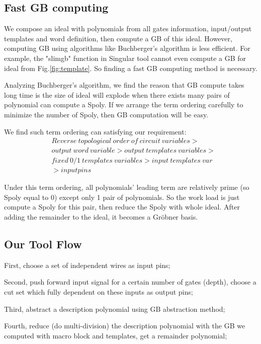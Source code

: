\documentclass[conference,10pt]{IEEEtran}
\begin{document}
\subsection{Fast GB computing}
We compose an ideal with polynomials from all gates information, input/output templates and word definition,
then compute a GB of this ideal. However, computing GB using algorithms like Buchberger's algorithm is
less efficient. For example, the "slimgb" function in Singular tool cannot even compute a GB for ideal
from Fig.\ref{fig:template}. So finding a fast GB computing method is necessary.

Analyzing Buchberger's algorithm, we find the reason that GB compute takes long time is the size of ideal
will explode when there exists many pairs of polynomial can compute a Spoly. If we arrange the term ordering
carefully to minimize the number of Spoly, then GB computation will be easy.

We find such term ordering can satisfying our requirement:
\begin{align}
&Reverse\ topological\ order\ of\ circuit\ variables > \nonumber\\
& output\ word\ variable > output\ templates\ variables>\nonumber\\
& fixed\ 0/1\ templates\ variables > input\ templates\ var\nonumber\\
& > input pins \nonumber
\end{align}

Under this term ordering, all polynomials' leading term are relatively prime (so Spoly equal to 0)
except only 1 pair of polynomials. So the work load is just compute a Spoly for this pair,
then reduce the Spoly with whole ideal. After adding the remainder to the ideal, it becomes
a Gr\"obner basis.

\subsection{Our Tool Flow}
First, choose a set of independent wires as input pins;

Second, push forward input signal for a certain number of gates (depth), choose a cut set
which fully dependent on these inputs as output pins;

Third, abstract a description polynomial using GB abstraction method;

Fourth, reduce (do multi-division) the description polynomial with the GB we computed with macro block 
and templates, get a remainder polynomial;
\end{document}
